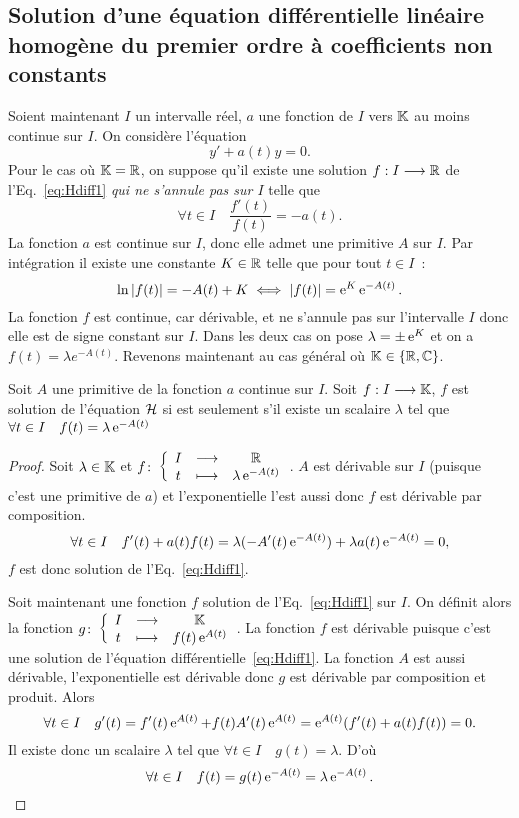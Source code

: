 \subsection{Solution d'une équation différentielle linéaire homogène du premier ordre à coefficients non constants}
Soient maintenant $I$ un intervalle réel, $a$ une fonction de $I$ vers $\mathbb{K}$ au moins continue sur $I$. On considère l'équation
\begin{equation}
y'+a(t)y=0 \label{eq:Hdiff1}.
\end{equation}
Pour le cas où $\mathbb{K}=\mathbb{R}$, on suppose qu'il existe une solution $f:I \longrightarrow \mathbb{R}$ de l'Eq.~\eqref{eq:Hdiff1} \emph{qui ne s'annule pas sur $I$} telle que
\begin{equation}
\forall t \in I \quad \frac{f'(t)}{f(t)}=-a(t).
\end{equation}
La fonction $a$ est continue sur $I$, donc elle admet une primitive $A$ sur $I$. Par intégration il existe une constante $K \in \mathbb{R}$ telle que pour tout $t \in I$~:
\begin{equation}
\ln\left\lvert f(t)\right\rvert=-A(t) +K \iff \left\lvert f(t)\right\rvert=\operatorname{e}^K \operatorname{e}^{-A(t)}.
\end{equation}
La fonction $f$ est continue, car dérivable, et ne s'annule pas sur l'intervalle $I$ donc elle est de signe constant sur $I$. Dans les deux cas on pose $\lambda=\pm \operatorname{e}^K$ et on a $f(t)=\lambda e^{-A(t)}$. Revenons maintenant au cas général où $\mathbb{K} \in \{\mathbb{R}, \mathbb{C}\}$.
%
\begin{theo}\label{theo:2}
Soit $A$ une primitive de la fonction $a$ continue sur $I$. Soit $f:I \longrightarrow \mathbb{K}$, $f$ est solution de l'équation $\mathcal{H}$ si est seulement s'il existe un scalaire $\lambda$ tel que $\forall t \in I \quad f(t)=\lambda \operatorname{e}^{-A(t)}$
\end{theo}
\begin{proof}
Soit $\lambda \in \mathbb{K}$ et $f\colon \left\{\begin{array}{ccc} I & \longrightarrow &\mathbb{R}\\ t & \longmapsto & \lambda \operatorname{e}^{-A(t)} \end{array} \right.$. $A$ est dérivable sur $I$ (puisque c'est une primitive de $a$) et l'exponentielle l'est aussi donc $f$ est dérivable par composition.
\begin{equation}
\forall t \in I \quad f'(t)+a(t)f(t)=\lambda(-A'(t)\operatorname{e}^{-A(t)}) + \lambda a(t)\operatorname{e}^{-A(t)}=0,
\end{equation}
$f$ est donc solution de l'Eq.~\eqref{eq:Hdiff1}.

Soit maintenant une fonction $f$ solution de l'Eq.~\eqref{eq:Hdiff1} sur $I$. On définit alors la fonction $g\colon \left\{\begin{array}{ccc} I & \longrightarrow &\mathbb{K}\\ t & \longmapsto & f(t)\operatorname{e}^{A(t)} \end{array} \right.$. La fonction $f$ est dérivable puisque c'est une solution de l'équation différentielle~\eqref{eq:Hdiff1}. La fonction  $A$ est aussi dérivable, l'exponentielle est dérivable donc $g$ est dérivable par composition et produit. Alors
\begin{equation}
\forall t \in I \quad g'(t)=f'(t) \operatorname{e}^{A(t)} + f(t)A'(t)\operatorname{e}^{A(t)}=\operatorname{e}^{A(t)}(f'(t) + a(t)f(t)) =0.
\end{equation}
Il existe donc un scalaire $\lambda$ tel que $\forall t \in I \quad g(t)=\lambda$. D'où 
\begin{equation} 
\forall t \in I \quad f(t)=g(t) \operatorname{e}^{-A(t)}=\lambda \operatorname{e}^{-A(t)}.
\end{equation}
\end{proof}

